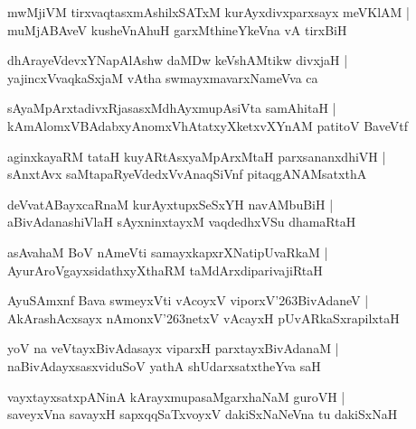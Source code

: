 \documentclass[twoside,12pt,openright]{book}
\def\S{\char'263}
\newcounter{shloka}[chapter]
\begin{document}
\begin{shloka}
mwMjiVM tirxvaqtasxmAshilxSATxM kurAyxdivxparxsayx meVKlAM |\\
muMjABAveV kusheVnAhuH  garxMthineYkeVna vA tirxBiH
\end{shloka}

\begin{shloka}
dhArayeVdevxYNapAlAshw daMDw keVshAMtikw divxjaH |\\
yajincxVvaqkaSxjaM vAtha swmayxmavarxNameVva ca 
\end{shloka}

\begin{shloka}
sAyaMpArxtadivxRjasasxMdhAyxmupAsiVta samAhitaH |\\
kAmAlomxVBAdabxyAnomxVhAtatxyXketxvXYnAM patitoV BaveVtf
\end{shloka}

\begin{shloka}
aginxkayaRM tataH kuyARtAsxyaMpArxMtaH parxsananxdhiVH |\\
sAnxtAvx saMtapaRyeVdedxVvAnaqSiVnf pitaqgANAMsatxthA
\end{shloka}

\begin{shloka}
deVvatABayxcaRnaM kurAyxtupxSeSxYH navAMbuBiH |\\
aBivAdanashiVlaH sAyxninxtayxM vaqdedhxVSu dhamaRtaH 
\end{shloka}

\begin{shloka}
asAvahaM BoV nAmeVti samayxkapxrXNatipUvaRkaM |\\
AyurAroVgayxsidathxyXthaRM taMdArxdiparivajiRtaH
\end{shloka}

\begin{shloka}
AyuSAmxnf Bava swmeyxVti vAcoyxV viporxV\S BivAdaneV |\\
AkArashAcxsayx nAmonxV\S netxV vAcayxH pUvARkaSxrapilxtaH
\end{shloka}

\begin{shloka}
yoV na veVtayxBivAdasayx viparxH parxtayxBivAdanaM |\\
naBivAdayxsasxviduSoV yathA shUdarxsatxtheYva saH 
\end{shloka}

\begin{shloka}
vayxtayxsatxpANinA kArayxmupasaMgarxhaNaM guroVH |\\
saveyxVna savayxH sapxqqSaTxvoyxV dakiSxNaNeVna tu dakiSxNaH 
\end{shloka}
\end{document}
